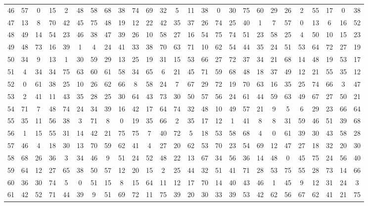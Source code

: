 \begin{table}
\begin{tabular}{c c c c c c c c c c c c c c c c c c c c c c c c c c }
46 & 57 & 0 & 15 & 2 & 48 & 58 & 68 & 38 & 74 & 69 & 32 & 5 & 11 & 38 & 0 & 30 & 75 & 60 & 29 & 26 & 2 & 55 & 17 & 0 & 38 \\
47 & 13 & 8 & 70 & 42 & 45 & 75 & 48 & 19 & 12 & 22 & 42 & 35 & 37 & 26 & 74 & 25 & 40 & 1 & 7 & 57 & 0 & 13 & 6 & 16 & 52 \\
48 & 49 & 14 & 54 & 23 & 46 & 38 & 47 & 39 & 26 & 10 & 58 & 27 & 16 & 54 & 75 & 74 & 51 & 23 & 58 & 25 & 4 & 50 & 10 & 15 & 23 \\
49 & 48 & 73 & 16 & 39 & 1 & 4 & 24 & 41 & 33 & 38 & 70 & 63 & 71 & 10 & 62 & 54 & 44 & 35 & 24 & 51 & 53 & 64 & 72 & 27 & 19 \\
50 & 34 & 9 & 13 & 1 & 30 & 59 & 29 & 13 & 25 & 19 & 31 & 15 & 53 & 66 & 27 & 72 & 37 & 34 & 21 & 68 & 14 & 48 & 19 & 53 & 17 \\
51 & 4 & 34 & 34 & 75 & 63 & 60 & 61 & 58 & 34 & 65 & 6 & 21 & 45 & 71 & 59 & 68 & 48 & 18 & 37 & 49 & 12 & 21 & 55 & 35 & 12 \\
52 & 0 & 61 & 38 & 25 & 10 & 26 & 62 & 66 & 8 & 58 & 24 & 7 & 67 & 29 & 72 & 19 & 70 & 63 & 16 & 35 & 25 & 74 & 66 & 3 & 47 \\
53 & 2 & 41 & 11 & 43 & 35 & 28 & 25 & 30 & 64 & 43 & 73 & 30 & 50 & 57 & 56 & 24 & 61 & 44 & 59 & 63 & 49 & 67 & 27 & 50 & 21 \\
54 & 71 & 7 & 48 & 74 & 24 & 34 & 39 & 16 & 42 & 17 & 64 & 74 & 32 & 48 & 10 & 49 & 57 & 21 & 9 & 5 & 6 & 29 & 23 & 66 & 64 \\
55 & 35 & 11 & 56 & 38 & 3 & 71 & 8 & 0 & 19 & 35 & 66 & 2 & 35 & 17 & 12 & 1 & 41 & 8 & 8 & 31 & 59 & 46 & 51 & 39 & 68 \\
56 & 1 & 15 & 55 & 31 & 14 & 42 & 21 & 75 & 75 & 7 & 40 & 72 & 5 & 18 & 53 & 58 & 68 & 4 & 0 & 61 & 39 & 30 & 43 & 58 & 28 \\
57 & 46 & 4 & 18 & 30 & 13 & 70 & 59 & 62 & 41 & 4 & 27 & 20 & 62 & 53 & 70 & 23 & 54 & 69 & 12 & 47 & 27 & 18 & 32 & 20 & 30 \\
58 & 68 & 26 & 36 & 3 & 34 & 46 & 9 & 51 & 24 & 52 & 48 & 22 & 13 & 67 & 34 & 56 & 36 & 14 & 48 & 0 & 45 & 75 & 24 & 56 & 40 \\
59 & 64 & 12 & 27 & 65 & 38 & 50 & 57 & 12 & 20 & 15 & 2 & 25 & 44 & 32 & 51 & 41 & 71 & 28 & 53 & 75 & 55 & 28 & 73 & 14 & 66 \\
60 & 36 & 30 & 74 & 5 & 0 & 51 & 15 & 8 & 15 & 64 & 11 & 12 & 17 & 70 & 14 & 40 & 43 & 46 & 1 & 45 & 9 & 12 & 31 & 24 & 3 \\
61 & 42 & 52 & 71 & 44 & 39 & 9 & 51 & 69 & 72 & 11 & 75 & 39 & 20 & 30 & 33 & 39 & 53 & 42 & 62 & 56 & 67 & 62 & 41 & 21 & 75 \\

\end{tabular}
\end{table}
